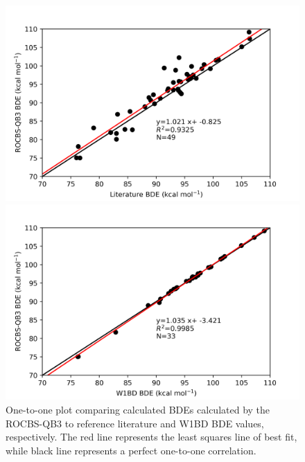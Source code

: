 \begin{figure}[H]
  \hspace*{-1.5cm}
  \begin{minipage}{8cm}
    \centering
    \includegraphics[width=\textwidth]{figures/lit-rocbsqb3}
  \end{minipage}%
  \begin{minipage}{8cm}
    \centering
    \includegraphics[width=\textwidth]{figures/w1bd-rocbsqb3}
  \end{minipage}
  \caption[One-to-one plot comparing BDEs calculated by ROCBS-QB3 to literature and W1BD BDEs.]{One-to-one plot comparing calculated BDEs calculated by the ROCBS-QB3 to reference literature\protect\cite{Luo2002} and W1BD BDE values, respectively. The red line represents the least squares line of best fit, while black line represents a perfect one-to-one correlation.}
  \label{fig:1-1-ROCBSQB3}
\end{figure}

